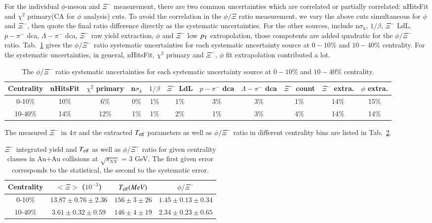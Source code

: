 For the individual $\phi$-meson and $\Xi^{-}$ measurement, there are two common uncertainties which are correlated or partially correlated: nHitsFit and $\chi^2$ primary(CA for $\phi$ analysis) cuts. To avoid the correlation in the $\phi/\Xi$ ratio measurement, we vary the above cuts simultaneous for $\phi$ and $\Xi^{-}$,  then quote the final ratio difference directly as the systematic uncertainties. For the other sources, include n$\sigma_{k}$, $1/\beta$, $\Xi^{-}$ LdL, $p-\pi^{-}$ dca, $\Lambda-\pi^{-}$ dca, $\Xi^{-}$ raw yield extraction, $\phi$ and $\Xi^{-}$ low $p_{\rm T}$ extropolation, those compotents are added quadratic for the $\phi/\Xi^{-}$ ratio. Tab.~\ref{tab:syserr_ratio} gives the $\phi/\Xi^-$ ratio systematic uncertainties for each systematic uncertainty source at $0-10\%$ and $10-40\%$ centrality. For the systematic uncertainties, in general, nHitsFit, $\chi^{2}$ primary and $\Xi^-$, $\phi$ fit extrapolation contributed a lot.

\begin{table}[]
    \centering
    \begin{tabular}{|c|c|c|c|c|c|c|c|c|c|c|}
    \hline
        Centrality & nHitsFit & $\chi^{2}$ primary &n$\sigma_{k}$ &$1/\beta$ & $\Xi^{-}$ LdL & $p-\pi^{-}$ dca & $\Lambda-\pi^{-}$ dca & $\Xi^-$ count & $\Xi^-$ extra. & $\phi$ extra. \\ \hline
        0-10\% & 10\% & 6\% & 0\% & 1\% & 1\% & 3\% & 3\% & 1\% & 14\% & 15\% \\
        10-40\% & 14\% & 12\% & 1\% & 1\% & 2\% & 1\% & 3\% & 4\% & 14\% & 14\% \\
        \hline
    \end{tabular}
    \caption{The $\phi/\Xi^-$ ratio systematic uncertainties for each systematic uncertainty source at $0-10\%$ and $10-40\%$ centrality.}
    \label{tab:syserr_ratio}
\end{table}

The measured $\Xi^{-}$ in $4\pi$ and the extracted $T_{\rm eff}$ parameters as well as $\phi/\Xi^-$ ratio in different centrality bins are listed in Tab.~\ref{tab:syserr_N_And_T}. 
\begin{table}[]
    \centering
    \begin{tabular}{|c|c|c|c|}
    \hline
        Centrality & $<\Xi>$ ($10^{-3}$) & $T_{\rm eff} (MeV)$ & $\phi/\Xi^{-}$ \\ \hline
        0-10\% & $13.87\pm 0.76 \pm 2.36$ & $156\pm 3 \pm 26$  & $1.45\pm 0.13\pm 0.34$\\
        10-40\% & $3.61 \pm 0.32 \pm 0.59$ & $146\pm 4 \pm 19$ & $2.34 \pm 0.23\pm 0.65$\\
        \hline
    \end{tabular}
    \caption{$\Xi^{-}$ integrated yield and $T_{\rm eff}$ as well as $\phi/\Xi^-$ ratio for given centrality classes in Au+Au collisions at $\sqrt{s_{NN}}$ = 3 GeV. The first given error corresponds to the statistical, the second to the systematic error.}
    \label{tab:syserr_N_And_T}
\end{table}

